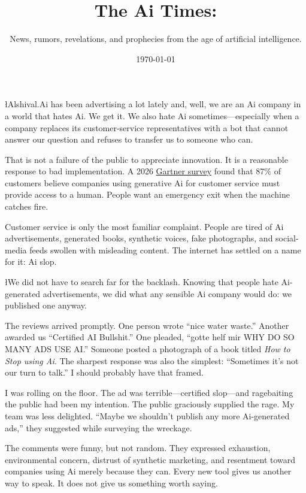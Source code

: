 \documentclass{news}
\title    {The Ai Times:}
\subtitle {News, rumors, revelations, and prophecies from the age of artificial intelligence.}
\date     {\today}
\begin{document}

{\l{A}lshival.Ai has been advertising a lot lately and, well, we are an Ai company in a world that hates Ai. We get it. We also hate Ai sometimes---especially when a company replaces its customer-service representatives with a bot that cannot answer our question and refuses to transfer us to someone who can.
\par}

That is not a failure of the public to appreciate innovation. It is a reasonable response to bad implementation. A 2026 \href{https://www.gartner.com/en/newsroom/press-releases/2026-08-04-gartner-survey-finds-87-percent-of-customers-say-companies-using-genai-for-customer-service-must-provide-access-to-a-human-agent0}{Gartner survey} found that 87\% of customers believe companies using generative Ai for customer service must provide access to a human. People want an emergency exit when the machine catches fire.

Customer service is only the most familiar complaint. People are tired of Ai advertisements, generated books, synthetic voices, fake photographs, and social-media feeds swollen with misleading content. The internet has settled on a name for it: Ai slop.


{\l{W}e did not have to search far for the backlash. Knowing that people hate Ai-generated advertisements, we did what any sensible Ai company would do: we published one anyway.
\par}

The reviews arrived promptly. One person wrote ``nice water waste.'' Another awarded us ``Certified AI Bullshit.'' One pleaded, ``gotte helf mir WHY DO SO MANY ADS USE AI.'' Someone posted a photograph of a book titled \emph{How to Stop using Ai}. The sharpest response was also the simplest: ``Sometimes it's not our turn to talk.'' I should probably have that framed.

I was rolling on the floor. The ad was terrible---certified slop---and ragebaiting the public had been my intention. The public graciously supplied the rage. My team was less delighted. ``Maybe we shouldn't publish any more Ai-generated ads,'' they suggested while surveying the wreckage.

The comments were funny, but not random. They expressed exhaustion, environmental concern, distrust of synthetic marketing, and resentment toward companies using Ai merely because they can. Every new tool gives us another way to speak. It does not give us something worth saying.
\end{document}
